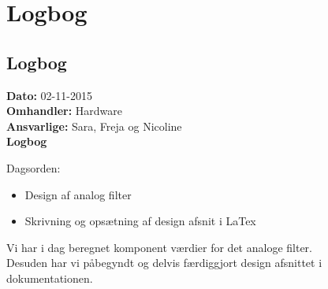 \chapter{Logbog}
\section{Logbog}

\textbf{Dato:} 02-11-2015 \\
\textbf{Omhandler:} Hardware \\
\textbf{Ansvarlige:} Sara, Freja og Nicoline \\
\textbf{Logbog}

Dagsorden:
\begin{itemize}
	\item Design af analog filter
	\item Skrivning og opsætning af design afsnit i LaTex
\end{itemize}

Vi har i dag beregnet komponent værdier for det analoge filter.\\
Desuden har vi påbegyndt og delvis færdiggjort design afsnittet i dokumentationen.\\

   
